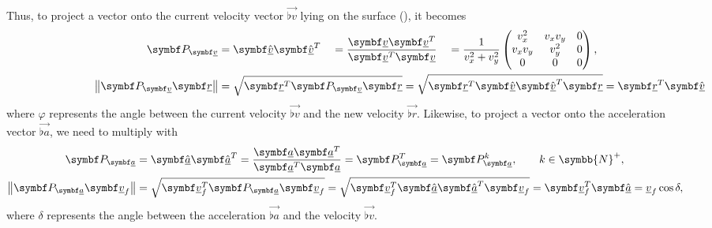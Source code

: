 Thus, to project a vector onto the current velocity vector $\vec{\flat{v}}$ lying on the surface (\greenarea), it becomes
\begin{alignat*}{4}
\projmat{\flat{v}} &= \uvec{\flat{v}} \uvec{\flat{v}}^T &&= \frac{\vec{\flat{v}} \vec{\flat{v}}^T}{\vec{\flat{v}}^T \vec{\flat{v}}} &&= \frac{1}{v_x^2 + v_y^2}
\begin{pmatrix}
v_x^2 & v_x v_y & 0\\
v_x v_y & v_y^2 & 0\\
0 & 0 & 0\\
\end{pmatrix},\\
%
\norm{\projmat{\flat{v}} \vec{\flat{r}}} &= \mathmakebox[0pt][l]{\sqrt{\vec{\flat{r}}^T \projmat{\flat{v}} \vec{\flat{r}}} = \sqrt{\vec{\flat{r}}^T \uvec{\flat{v}} \uvec{\flat{v}}^T \vec{\flat{r}}} = \vec{\flat{r}}^T \uvec{\flat{v}} = \flat{r} \cos\varphi,}
\end{alignat*}
where $\varphi$ represents the angle between the current velocity $\vec{\flat{v}}$ and the new velocity $\vec{\flat{r}}$. Likewise, to project a vector onto the acceleration vector $\vec{\flat{a}}$, we need to multiply with
\begin{align*}
\projmat{\flat{a}} &= \uvec{\flat{a}} \uvec{\flat{a}}^T = \frac{\vec{\flat{a}} \vec{\flat{a}}^T}{\vec{\flat{a}}^T \vec{\flat{a}}} =
\projmat{\flat{a}}^T = \projmat{\flat{a}}^k, \qquad k \in \symbb{N}^+,\\
%
\norm{\projmat{\flat{a}} \vec{\flat{v}}_f} &= \sqrt{\vec{\flat{v}}_f^T \projmat{\flat{a}} \vec{\flat{v}}_f} = \sqrt{\vec{\flat{v}}_f^T \uvec{\flat{a}} \uvec{\flat{a}}^T \vec{\flat{v}}_f} = \vec{\flat{v}}_f^T \uvec{\flat{a}} = \flat{v}_f \cos\delta,
\end{align*}
where $\delta$ represents the angle between the acceleration $\vec{\flat{a}}$ and the velocity $\vec{\flat{v}}$.
